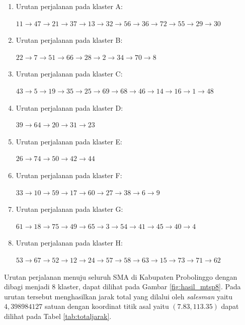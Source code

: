 \begin{enumerate}
\item Urutan perjalanan pada klaster A:

$11\rightarrow47\rightarrow21\rightarrow37\rightarrow13\rightarrow32\rightarrow56\rightarrow36\rightarrow72\rightarrow55\rightarrow29\rightarrow30$

\item Urutan perjalanan pada klaster B:

$22\rightarrow7\rightarrow51\rightarrow66\rightarrow28\rightarrow2\rightarrow34\rightarrow70\rightarrow8$

\item Urutan perjalanan pada klaster C:

$43\rightarrow5\rightarrow19\rightarrow35\rightarrow25\rightarrow69\rightarrow68\rightarrow46\rightarrow14\rightarrow16\rightarrow1\rightarrow48$

\item Urutan perjalanan pada klaster D:

$39\rightarrow64\rightarrow20\rightarrow31\rightarrow23$

\item Urutan perjalanan pada klaster E:

$26\rightarrow74\rightarrow50\rightarrow42\rightarrow44$

\item Urutan perjalanan pada klaster F:

$33\rightarrow10\rightarrow59\rightarrow17\rightarrow60\rightarrow27\rightarrow38\rightarrow6\rightarrow9$

\item Urutan perjalanan pada klaster G:

$61\rightarrow18\rightarrow75\rightarrow49\rightarrow65\rightarrow3\rightarrow54\rightarrow41\rightarrow45\rightarrow40\rightarrow4$

\item Urutan perjalanan pada klaster H:

$53\rightarrow67\rightarrow52\rightarrow12\rightarrow24\rightarrow57\rightarrow58\rightarrow63\rightarrow15\rightarrow73\rightarrow71\rightarrow62$
\end{enumerate}

Urutan perjalanan menuju seluruh SMA di Kabupaten Probolinggo dengan dibagi menjadi 8 klaster, dapat dilihat pada Gambar \ref{fig:hasil_mtsp8}. Pada urutan tersebut menghasilkan jarak total yang dilalui oleh \textit{salesman} yaitu $4,398984127$ satuan dengan koordinat titik asal yaitu $(7.83, 113.35)$ dapat dilihat pada Tabel \ref{tab:totaljarak}.

